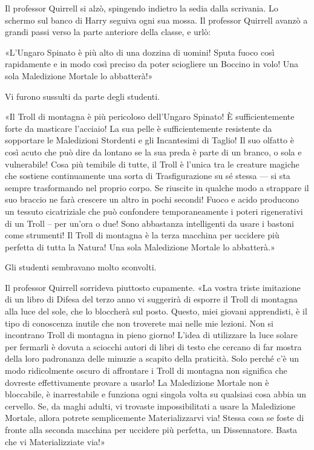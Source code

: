 Il professor Quirrell si alzò, spingendo indietro la sedia dalla scrivania. Lo schermo sul banco di Harry seguiva ogni sua mossa. Il professor Quirrell avanzò a grandi passi verso la parte anteriore della classe, e urlò:

«L’Ungaro Spinato è più alto di una dozzina di uomini! Sputa fuoco così rapidamente e in modo così preciso da poter sciogliere un Boccino in volo! Una sola Maledizione Mortale lo abbatterà!»

Vi furono sussulti da parte degli studenti.

«Il Troll di montagna è più pericoloso dell’Ungaro Spinato! È sufficientemente forte da masticare l’acciaio! La sua pelle è sufficientemente resistente da sopportare le Maledizioni Stordenti e gli Incantesimi di Taglio! Il suo olfatto è così acuto che può dire da lontano se la sua preda è parte di un branco, o sola e vulnerabile! Cosa più temibile di tutte, il Troll è l’unica tra le creature magiche che sostiene continuamente una sorta di Trasfigurazione su sé stessa — si sta sempre trasformando nel proprio corpo. Se riuscite in qualche modo a strappare il suo braccio ne farà crescere un altro in pochi secondi! Fuoco e acido producono un tessuto cicatriziale che può confondere temporaneamente i poteri rigenerativi di un Troll – per un’ora o due! Sono abbastanza intelligenti da usare i bastoni come strumenti! Il Troll di montagna è la terza macchina per uccidere più perfetta di tutta la Natura! Una sola Maledizione Mortale lo abbatterà.»

Gli studenti sembravano molto sconvolti.

Il professor Quirrell sorrideva piuttosto cupamente. «La vostra triste imitazione di un libro di Difesa del terzo anno vi suggerirà di esporre il Troll di montagna alla luce del sole, che lo bloccherà sul posto. Questo, miei giovani apprendisti, è il tipo di conoscenza inutile che non troverete mai nelle mie lezioni. Non si incontrano Troll di montagna in pieno giorno! L’idea di utilizzare la luce solare per fermarli è dovuta a sciocchi autori di libri di testo che cercano di far mostra della loro padronanza delle minuzie a scapito della praticità. Solo perché c’è un modo ridicolmente oscuro di affrontare i Troll di montagna non significa che dovreste effettivamente provare a usarlo! La Maledizione Mortale non è bloccabile, è inarrestabile e funziona ogni singola volta su qualsiasi cosa abbia un cervello. Se, da maghi adulti, vi trovaste impossibilitati a usare la Maledizione Mortale, allora potrete semplicemente Materializzarvi via! Stessa cosa se foste di fronte alla seconda macchina per uccidere più perfetta, un Dissennatore. Basta che vi Materializziate via!»

